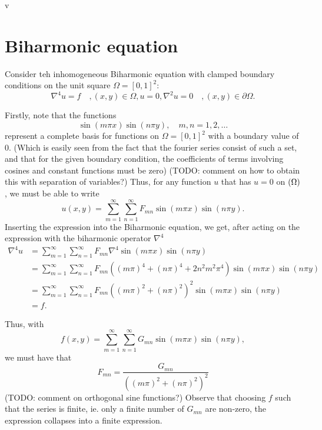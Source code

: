 v\section{Biharmonic equation}
\label{sec:PDE}

\newtheorem{theorem}{Theorem}
\newtheorem{lemma}{Lemma}

Consider teh inhomogeneous Biharmonic equation with clamped boundary conditions on the unit square $\Omega = [0, 1]^2$:
\begin{subequations}\label{eq:PDE}
  \begin{equation}
    \nabla^4 u = f \quad, (x, y) \in \Omega,
  \end{equation}
  \begin{equation}
    u = 0, \nabla^2u = 0 \quad, (x, y) \in \partial\Omega.
  \end{equation}
\end{subequations}

Firstly, note that the functions
$$
\sin(m \pi x) \sin(n \pi y), \quad m,n = 1, 2, \dots
$$
represent a complete basis for functions on $\Omega = [0, 1]^2$ with a boundary value of 0.
(Which is easily seen from the fact that the fourier series consist of such a set, and that for the given boundary condition, the coefficients of terms involving cosines and constant functions must be zero)
(TODO: comment on how to obtain this with separation of variables?)
Thus, for any function $u$ that has $u = 0$ on $\del\Omega$, we must be able to write
$$
u(x, y) =
\sum_{m=1}^\infty
\sum_{n=1}^\infty
F_{mn}
\sin(m\pi x)
\sin(n\pi y).
$$
Inserting the expression into the Biharmonic equation, we get, after acting on the expression with the biharmonic operator $\nabla^4$
\begin{align}
  \nabla^4 u &=
  \sum_{m=1}^\infty
  \sum_{n=1}^\infty
  F_{mn}
  \nabla^4
  \sin(m\pi x)\sin(n\pi y)\\
  &=
  \sum_{m=1}^\infty
  \sum_{n=1}^\infty
  F_{mn}
  \left(
  (m\pi)^4 + (n\pi)^4 + 2n^2m^2\pi^4
  \right)
  \sin(m\pi x)\sin(n\pi y)\\
  &=
  \sum_{m=1}^\infty
  \sum_{n=1}^\infty
  F_{mn}
  \left(
  (m\pi)^2 + (n\pi)^2
  \right)^2
  \sin(m\pi x)\sin(n\pi y)\\
  &= f.
\end{align}

Thus, with
$$
f(x, y)
=
\sum_{m=1}^\infty
\sum_{n=1}^\infty
G_{mn}
\sin(m\pi x)\sin(n\pi y),
$$
we must have that
$$
F_{mn} =
\frac{
  G_{mn}
}{
  \left(
  (m\pi)^2 + (n\pi)^2
  \right)^2
}
$$
(TODO: comment on orthogonal sine functions?)
Observe that choosing $f$ such that the series is finite, ie. only a finite number of $G_{mn}$ are non-zero, the expression collapses into a finite expression.

